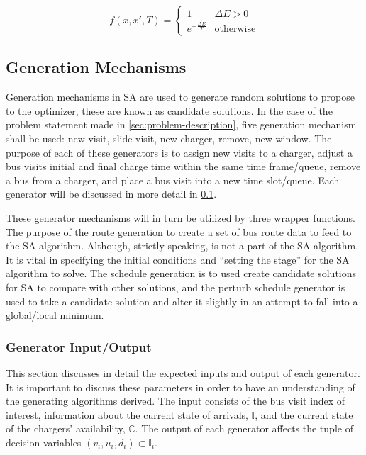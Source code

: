 \documentclass[11pt,a4paper,final]{article}
\newcommand{\I}{\mathbb{I}}                 %
\newcommand{\C}{\mathbb{C}}                 %
\begin{document}
\begin{equation}
\label{eq:candaccept}
f(x,x',T) =
\begin{cases}
  1                 & \Delta E > 0 \\
  e^{- \frac{\Delta E}{T}} & \text{otherwise}
\end{cases}
\end{equation}

\subsection{Generation Mechanisms}
\label{sec:generators}
Generation mechanisms in SA are used to generate random solutions to propose to the optimizer, these are known as
candidate solutions. In the case of the problem statement made in \ref{sec:problem-description}, five generation mechanism
shall be used: new visit, slide visit, new charger, remove, new window. The purpose of each of these generators is to
assign new visits to a charger, adjust a bus visits initial and final charge time within the same time frame/queue,
remove a bus from a charger, and place a bus visit into a new time slot/queue. Each generator will be discussed in more
detail in \ref{sec:generators}.

These generator mechanisms will in turn be utilized by three wrapper functions. The purpose of the route generation to
create a set of bus route data to feed to the SA algorithm. Although, strictly speaking, is not a part of the SA
algorithm. It is vital in specifying the initial conditions and ``setting the stage'' for the SA algorithm to solve. The
schedule generation is to used create candidate solutions for SA to compare with other solutions, and the perturb
schedule generator is used to take a candidate solution and alter it slightly in an attempt to fall into a global/local
minimum.

\subsubsection{Generator Input/Output}
\label{sec:generator-input-output}
This section discusses in detail the expected inputs and output of each generator. It is important to discuss these
parameters in order to have an understanding of the generating algorithms derived. The input consists of the bus visit
index of interest, information about the current state of arrivals, \(\I\), and the current state of the chargers'
availability, \(\C\). The output of each generator affects the tuple of decision variables \((v_i, u_i, d_i) \subset \I_i\).
\end{document}
